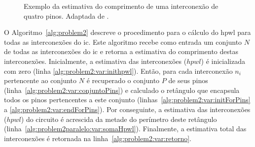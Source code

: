 \begin{figure}[ht]
    \centering
    \hspace{1cm}
    \caption[Exemplo do cálculo de HPWL.]{Exemplo da estimativa do comprimento de uma interconexão de quatro pinos. Adaptada de .}
    \label{fig:problem2}
\end{figure}

O Algoritmo~\ref{alg:problem2} descreve o procedimento para o cálculo do \ac{hpwl} para todas as interconexões do \ac{ic}. 
Este algoritmo recebe como entrada um conjunto $N$ de todas as interconexões do \ac{ic} e retorna a estimativa do comprimento destas interconexões.
Inicialmente, a estimativa das interconexões ($hpwl$) é inicializada com zero (linha \ref{alg:problem2:var:inithpwl}).
Então, para cada interconexão $n_i$ pertencente ao conjunto $N$ é recuperado o conjunto $P$ de seus pinos (linha~\ref{alg:problem2:var:conjuntoPins}) e calculado o retângulo que encapsula todos os pinos pertencentes a este conjunto (linhas~\ref{alg:problem2:var:initForPins} a \ref{alg:problem2:var:endForPins}).
Por conseguinte, a estimativa das interconexões ($hpwl$) do circuito é acrescida da metade do perímetro deste retângulo (linha~\ref{alg:problem2paralelo:var:somaHpwl}).
Finalmente, a estimativa total das interconexões é retornada na linha~\ref{alg:problem2:var:retorno}.


